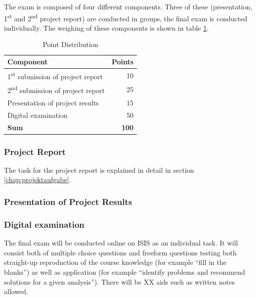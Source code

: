 \documentclass[headinclude=true]{scrartcl}
\begin{document}
The exam is composed of four different components. Three of these (presentation, 1\textsuperscript{st} and 2\textsuperscript{nd} project report) are conducted in groups, the final exam is conducted individually. The weighing of these components is shown in table \ref{tab:komponenten}.

\begin{table} \centering
 \caption{Point Distribution}
 \label{tab:komponenten}
 \begin{tabular}{lr}
  \toprule
  Component & Points \\ \midrule
  1\textsuperscript{st} submission of project report & 10 \\ 
  2\textsuperscript{nd} submission of project report & 25 \\ 
  Presentation of project results & 15 \\ 
  Digital examination & 50 \\ \midrule
  \textbf{Sum} & \textbf{100} \\ \bottomrule
 \end{tabular}
\end{table}

\subsubsection{Project Report}

The task for the project report is explained in detail in section \ref{chap:projektaufgabe}.

\subsubsection{Presentation of Project Results}


\subsubsection{Digital examination}

The final exam will be conducted online on ISIS as an individual task. It will consist both of multiple choice questions and freeform questions testing both straight-up reproduction of the course knowledge (for example ``fill in the blanks'') as well as application (for example ``identify problems and recommend solutions for a given analysis''). There will be XX aids such as written notes allowed.
\end{document}

